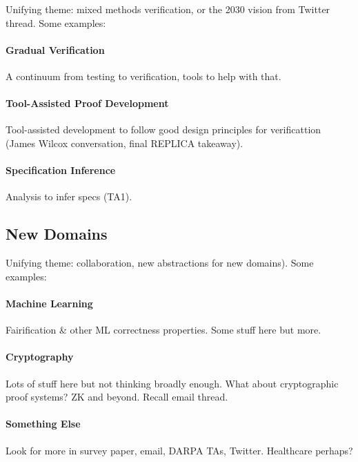 Unifying theme: mixed methods verification, or the 2030 vision from Twitter thread. Some examples:

\paragraph{Gradual Verification} A continuum from testing to verification, tools to help with that.

\paragraph{Tool-Assisted Proof Development} Tool-assisted development to follow good design principles for verificattion (James Wilcox conversation, final REPLICA takeaway).

\paragraph{Specification Inference} Analysis to infer specs (TA1).

\subsection*{New Domains}

Unifying theme: collaboration, new abstractions for new domains). Some examples:

\paragraph{Machine Learning} Fairification \& other ML correctness properties. Some stuff here but more.

\paragraph{Cryptography} Lots of stuff here but not thinking broadly enough. What about cryptographic proof systems? ZK and beyond. Recall email thread.

\paragraph{Something Else} Look for more in survey paper, email, DARPA TAs, Twitter. Healthcare perhaps? %

